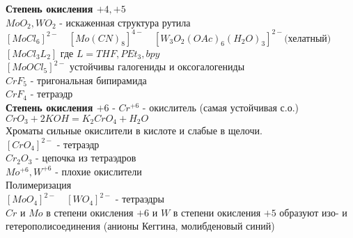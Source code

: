 \textbf{Степень окисления $+4, +5$} \\
$MoO_2, WO_2$ - искаженная структура рутила \\
$ \left[MoCl_6 \right]^{2-} \quad \left[Mo(CN)_8 \right]^{4-} \quad \left[W_3O_2(OAc)_6(H_2O)_3\right]^{2-} \text{(хелатный)} $ \\
$ \left[MoCl_3L_2 \right] $ где $L = THF, PEt_3,  bpy$ \\
$\left[MoOCl_5 \right]^{2-}$ устойчивы галогениды и оксогалогениды \\
$CrF_5$ - тригональная бипирамида \\
$CrF_4$ - тетраэдр \\
\textbf{Степень окисления $+6$} - $Cr^{+6}$ - окислитель (самая устойчивая с.о.)\\
$CrO_3 + 2KOH = K_2CrO_4 + H_2O$ \\ 
Хроматы сильные окислители в кислоте и слабые в щелочи. \\
$\left[CrO_4\right]^{2-}  $ - тетраэдр \\
$ Cr_2O_3 $ - цепочка из тетраэдров \\
$Mo^{+6}, W^{+6}$ - плохие окислители \\
Полимеризация \\
$\left[MoO_4\right]^{2-} \quad \left[WO_4\right]^{2-} $ - тетраэдры \\
$Cr$ и $Mo$ в степени окисления $+6$ и $W$ в степени окисления $+5$ образуют изо- и гетерополисоединения (анионы Кеггина, молибденовый синий)


